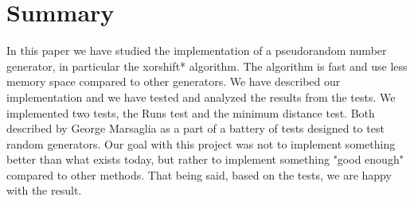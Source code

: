 \section{Summary}
In this paper we have studied the implementation of a pseudorandom number generator, in particular the xorshift* algorithm. The algorithm is fast and use less memory space compared to other generators. We have described our implementation and we have tested and analyzed the results from the tests. We implemented two tests, the Runs test and the minimum distance test. Both described by George Marsaglia as a part of a battery of tests designed to test random generators. Our goal with this project was not to implement something better than what exists today, but rather to implement something "good enough" compared to other methods. That being said, based on the tests, we are happy with the result.